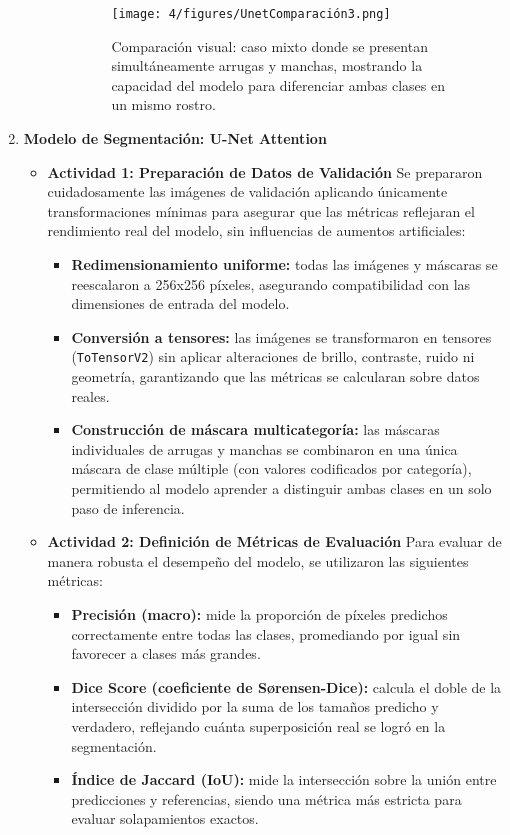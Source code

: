 \begin{enumerate}
\begin{itemize}
\begin{itemize}
\begin{figure}[H]
\centering
\texttt{[image: 4/figures/UnetComparación3.png]}
\caption{Comparación visual: caso mixto donde se presentan simultáneamente arrugas y manchas, mostrando la capacidad del modelo para diferenciar ambas clases en un mismo rostro.}
\label{fig:validacion33}
\end{figure}
\end{itemize}

  \end{itemize}

  \item \textbf{Modelo de Segmentación: U-Net Attention}
  \begin{itemize}
  \item\textbf{Actividad 1: Preparación de Datos de Validación}
  Se prepararon cuidadosamente las imágenes de validación aplicando únicamente transformaciones mínimas para asegurar que las métricas reflejaran el rendimiento real del modelo, sin influencias de aumentos artificiales:
\begin{itemize}
  \item \textbf{Redimensionamiento uniforme:} todas las imágenes y máscaras se reescalaron a 256x256 píxeles, asegurando compatibilidad con las dimensiones de entrada del modelo.
  \item \textbf{Conversión a tensores:} las imágenes se transformaron en tensores (\texttt{ToTensorV2}) sin aplicar alteraciones de brillo, contraste, ruido ni geometría, garantizando que las métricas se calcularan sobre datos reales.
  \item \textbf{Construcción de máscara multicategoría:} las máscaras individuales de arrugas y manchas se combinaron en una única máscara de clase múltiple (con valores codificados por categoría), permitiendo al modelo aprender a distinguir ambas clases en un solo paso de inferencia.
\end{itemize}

\vspace{0.5cm}

  \item\textbf{Actividad 2: Definición de Métricas de Evaluación}
  Para evaluar de manera robusta el desempeño del modelo, se utilizaron las siguientes métricas:
\begin{itemize}
  \item \textbf{Precisión (macro):} mide la proporción de píxeles predichos correctamente entre todas las clases, promediando por igual sin favorecer a clases más grandes.
  \item \textbf{Dice Score (coeficiente de Sørensen-Dice):} calcula el doble de la intersección dividido por la suma de los tamaños predicho y verdadero, reflejando cuánta superposición real se logró en la segmentación.
  \item \textbf{Índice de Jaccard (IoU):} mide la intersección sobre la unión entre predicciones y referencias, siendo una métrica más estricta para evaluar solapamientos exactos.
\end{itemize}


\end{itemize}
\end{enumerate}
